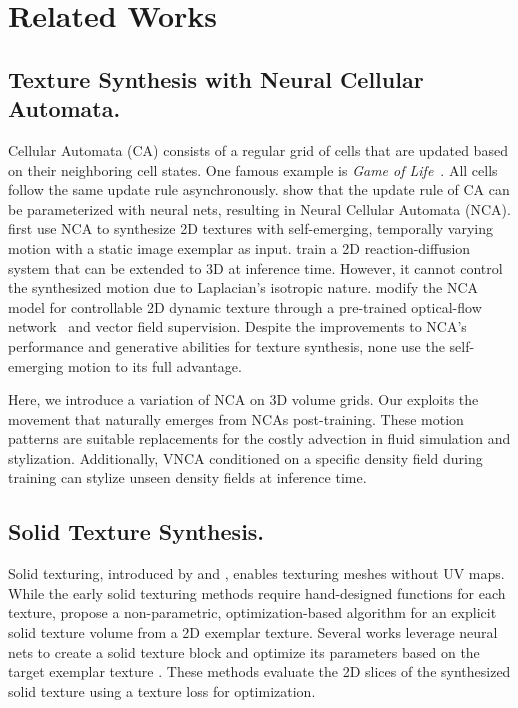\section{Related Works}

\subsection{Texture Synthesis with Neural Cellular Automata. }
Cellular Automata (CA) consists of a regular grid of cells that are updated based on their neighboring cell states. 
One famous example is \textit{Game of Life}~\cite{gardner1970fantastic}. 
All cells follow the same update rule asynchronously. 
\citet{gilpin2019cellular} show that the update rule of CA can be parameterized with neural nets, resulting in Neural Cellular Automata (NCA). 
\citet{niklasson2021selforganising} first use NCA to synthesize 2D textures with self-emerging, temporally varying motion with a static image exemplar as input. 
\citet{diff-program-rdsystem} train a 2D reaction-diffusion system that can be extended to 3D at inference time. 
However, it cannot control the synthesized motion due to Laplacian's isotropic nature. 
\citet{pajouheshgar2023dynca} modify the NCA model for controllable 2D dynamic texture through a pre-trained optical-flow network~\cite{tesfaldet2018two} and vector field supervision.
Despite the improvements to NCA's performance and generative abilities for texture synthesis, none use the self-emerging motion to its full advantage.

Here, we introduce a variation of NCA on 3D volume grids.
Our \MethodName{} exploits the movement that naturally emerges from NCAs post-training. These motion patterns are suitable replacements for the costly advection in fluid simulation and stylization. 
Additionally, VNCA conditioned on a specific density field during training can stylize unseen density fields at inference time. 


\subsection{Solid Texture Synthesis.}
Solid texturing, introduced by \citet{solid_textures} and \citet{perlin_noise}, enables texturing meshes without UV maps. 
While the early solid texturing methods \cite{solid_textures, perlin_noise} require hand-designed functions for each texture, \citet{kopf2007solid} propose a non-parametric, optimization-based algorithm for an explicit solid texture volume from a 2D exemplar texture. 
Several works leverage neural nets to create a solid texture block and optimize its parameters based on the target exemplar texture \cite{gramgan, on-demand-solid-texture, neural-texture-space}. 
These methods evaluate the 2D slices of the synthesized solid texture using a texture loss \cite{gatys2015texture} for optimization. 

